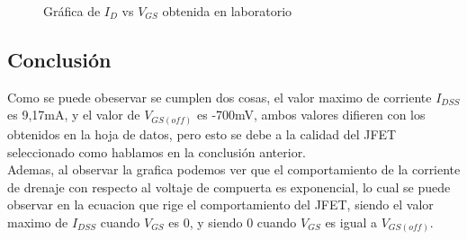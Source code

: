 \begin{figure}[ht]
    \centering
    \caption{Gráfica de $I_D$ vs $V_{GS}$ obtenida en laboratorio}
\end{figure}

\vspace{0.05cm}

\newpage

\subsection{Conclusión}

Como se puede obeservar se cumplen dos cosas, el valor maximo de corriente $I_{DSS}$ es 9,17mA, y el valor de $V_{GS(off)}$ es -700mV, ambos valores difieren con los obtenidos en la hoja de datos, pero esto se debe a la calidad del JFET seleccionado como hablamos en la conclusión anterior.\\
Ademas, al observar la grafica podemos ver que el comportamiento de la corriente de drenaje con respecto al voltaje de compuerta es exponencial, lo cual se puede observar en la ecuacion que rige el comportamiento del JFET, siendo el valor maximo de  $I_{DSS}$ cuando $V_{GS}$ es 0, y siendo 0 cuando $V_{GS}$ es igual a $V_{GS(off)}$.
